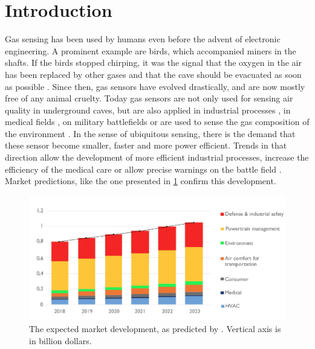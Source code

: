 \section{Introduction}
\label{sec:introduction}

Gas sensing has been used by humans even before the advent of electronic engineering. A prominent example are birds, which accompanied miners in the shafts. If the birds stopped chirping, it was the signal that the oxygen in the air has been replaced by other gases and that the cave should be evacuated as soon as possible \cite{nrc1991}. Since then, gas sensors have evolved drastically, and are now mostly free of any animal cruelty. Today gas sensors are not only used for sensing air quality in underground caves, but are also applied in industrial processes \cite{Johny2016, Wang2017}, in medical fields \cite{Eamsaard2016, Wilson2018}, on military battlefields \cite{Kumar2020a} or are used to sense the gas composition of the environment \cite{Harrou2018}. In the sense of ubiquitous sensing, there is the demand that these sensor become smaller, faster and more power efficient. Trends in that direction allow the development of more efficient industrial processes, increase the efficiency of the medical care or allow precise warnings on the battle field \cite{Wang2022, Kumar2020, Mathew2021}. Market predictions, like the one presented in \cref{fig:gas_sensor_market} confirm this development. \\
\begin{figure}
\centering
    \includegraphics[width=\textwidth]{01_introduction/fig/gas_sensor_market.jpg}
    \caption{The expected market development, as predicted by \cite{yole2021}. Vertical axis is in billion dollars.}
    \label{fig:gas_sensor_market}
\end{figure}
